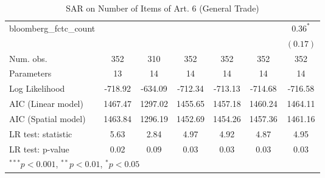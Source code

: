 \begin{table}[!h]
\begin{center}
\begin{tabular}{l c c c c c c }
bloomberg\_fctc\_count  &              &              &              &              &              & $0.36^{*}$   \\
                        &              &              &              &              &              & $(0.17)$     \\
\midrule
Num. obs.               & 352          & 310          & 352          & 352          & 352          & 352          \\
Parameters              & 13           & 14           & 14           & 14           & 14           & 14           \\
Log Likelihood          & -718.92      & -634.09      & -712.34      & -713.13      & -714.68      & -716.58      \\
AIC (Linear model)      & 1467.47      & 1297.02      & 1455.65      & 1457.18      & 1460.24      & 1464.11      \\
AIC (Spatial model)     & 1463.84      & 1296.19      & 1452.69      & 1454.26      & 1457.36      & 1461.16      \\
LR test: statistic      & 5.63         & 2.84         & 4.97         & 4.92         & 4.87         & 4.95         \\
LR test: p-value        & 0.02         & 0.09         & 0.03         & 0.03         & 0.03         & 0.03         \\
\bottomrule
\multicolumn{7}{l}{\scriptsize{$^{***}p<0.001$, $^{**}p<0.01$, $^*p<0.05$}}
\end{tabular}
\caption{SAR on Number of Items of Art. 6 (General Trade)}
\label{table:coefficients}
\end{center}
\end{table}
